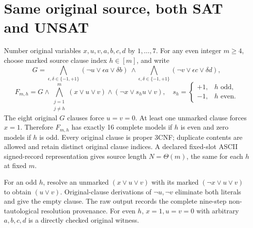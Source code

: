 \documentclass[11pt]{article}
\begin{document}
\section{Same original source, both SAT and UNSAT}
Number original variables $x,u,v,a,b,c,d$ by $1,\ldots,7$. For any even integer $m\ge4$, choose marked source clause index $h\in[m]$, and write
\[
 G=\bigwedge_{\epsilon,\delta\in\{-1,+1\}}(\neg u\vee \epsilon a\vee\delta b)
 \ \land\!\bigwedge_{\epsilon,\delta\in\{-1,+1\}}
 (\neg v\vee\epsilon c\vee\delta d),
\]
\[
 F_{m,h}=G\land\bigwedge_{\substack{j=1\\j\ne h}}^m
 (x\vee u\vee v)
 \land(\neg x\vee s_hu\vee v),\quad
 s_h=\begin{cases}+1,&h\text{ odd},\\-1,&h\text{ even}.\end{cases}
\]
The eight original $G$ clauses force $u=v=0$. At least one unmarked clause forces $x=1$. Therefore $F_{m,h}$ has exactly 16 complete models if $h$ is even and zero models if $h$ is odd. Every original clause is proper 3CNF; duplicate contents are allowed and retain distinct original clause indices. A declared fixed-slot ASCII signed-record representation gives source length $N=\Theta(m)$, the same for each $h$ at fixed $m$.

For an odd $h$, resolve an unmarked $(x\vee u\vee v)$ with its marked $(\neg x\vee u\vee v)$ to obtain $(u\vee v)$. Original-clause derivations of $\neg u,\neg v$ eliminate both literals and give the empty clause. The raw output records the complete nine-step non-tautological resolution provenance. For even $h$, $x=1,u=v=0$ with arbitrary $a,b,c,d$ is a directly checked original witness.
\end{document}
